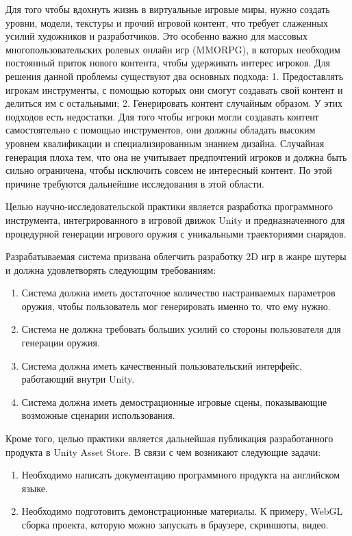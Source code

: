 ﻿

Для того чтобы вдохнуть жизнь в виртуальные игровые миры, нужно
создать уровни, модели, текстуры и прочий игровой контент, что требует слаженных усилий художников и разработчиков. Это особенно важно для массовых многопользовательских ролевых онлайн игр (MMORPG), в которых необходим постоянный приток нового контента, чтобы удерживать интерес игроков.
Для решения данной проблемы существуют два основных подхода:
1. Предоставлять игрокам инструменты, с помощью которых они смогут создавать свой контент и делиться им с остальными;
2. Генерировать контент случайным образом. У этих подходов есть недостатки. Для того чтобы игроки могли создавать контент самостоятельно с помощью инструментов, они должны обладать высоким уровнем квалификации и специализированным знанием дизайна. Случайная генерация плоха тем, что она не учитывает предпочтений игроков и должна быть сильно ограничена, чтобы исключить совсем не интересный контент. По этой причине требуются дальнейшие исследования в этой области.

\pagebreak


Целью научно-исследовательской практики является разработка программного инструмента, интегрированного в игровой движок Unity и предназначенного для процедурной генерации игрового оружия с уникальными траекториями снарядов.

Разрабатываемая система призвана облегчить разработку 2D игр в жанре шутеры и должна удовлетворять следующим требованиям:
\begin{enumerate}
    \item Система должна иметь достаточное количество настраиваемых параметров оружия, чтобы пользователь мог генерировать именно то, что ему нужно.
    \item Система не должна требовать больших усилий со стороны пользователя для генерации оружия.
    \item Система должна иметь качественный пользовательский интерфейс, работающий внутри Unity.
    \item Система должна иметь демострационные игровые сцены, показывающие возможные сценарии использования.
\end{enumerate}

Кроме того, целью практики является дальнейшая публикация разработанного продукта в Unity Asset Store. В связи с чем возникают следующие задачи:
\begin{enumerate}
    \item Необходимо написать документацию программного продукта на английском языке.
    \item Необходимо подготовить демонстрационные материалы. К примеру, WebGL сборка проекта, которую можно запускать в браузере, скриншоты, видео.
\end{enumerate}

